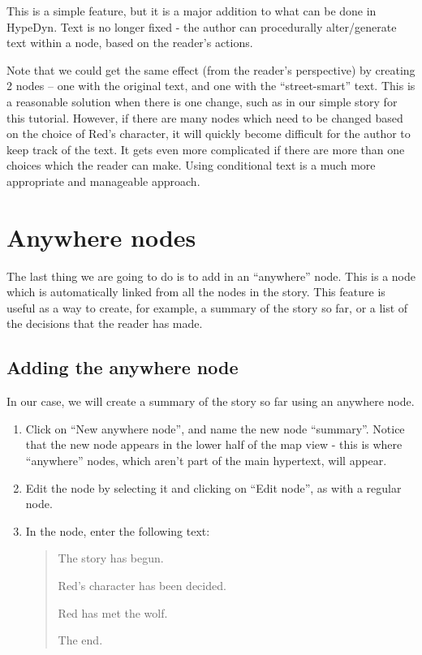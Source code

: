 \documentclass{article}
\begin{document}
This is a simple feature, but it is a major addition to what can be done in
HypeDyn. Text is no longer fixed - the author can procedurally alter/generate
text within a node, based on the reader's actions. 

Note that we could get the same effect (from the reader's perspective) by
creating 2 nodes -- one with the original text, and one with the ``street-smart''
text. This is a reasonable solution when there is one change, such as in our
simple story for this tutorial. However, if there are many nodes which need to
be changed based on the choice of Red's character, it will quickly become
difficult for the author to keep track of the text. It gets even more
complicated if there are more than one choices which the reader can make. Using
conditional text is a much more appropriate and manageable approach.

\section{Anywhere nodes}

The last thing we are going to do is to add in an ``anywhere'' node. This is a
node which is automatically linked from all the nodes in the story. This
feature is useful as a way to create, for example, a summary of the story so
far, or a list of the decisions that the reader has made. 

\subsection{Adding the anywhere node}
In our case, we will create a summary of the story so far using an anywhere
node.

\begin{enumerate}
  \item Click on ``New anywhere node'', and name the new node ``summary''.
  Notice that the new node appears in the lower half of the map view - this is
  where ``anywhere'' nodes, which aren't part of the main hypertext, will
  appear.

  \item Edit the node by selecting it and clicking on ``Edit node'', as with a
  regular node.

  \item In the node, enter the following text:
  \begin{quotation}
  \noindent The story has begun.
  
  \bigskip
  
  \noindent Red's character has been decided.

  \bigskip

  \noindent Red has met the wolf.

  \bigskip

  \noindent The end.
  \end{quotation}
\end{enumerate}
\end{document}
